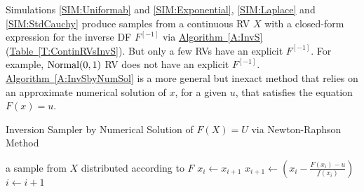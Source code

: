 Simulations \ref*{SIM:Uniformab} and \ref*{SIM:Exponential}, \ref*{SIM:Laplace} and \ref*{SIM:StdCauchy}
produce samples from a continuous RV $X$ with a closed-form expression for the inverse DF $F^{[-1]}$ via \hyperref[A:InvS]{Algorithm~\ref*{A:InvS}} (\hyperref[T:ContinRVsInvS]{Table~\ref*{T:ContinRVsInvS}}).  But only a few RVs have an explicit $F^{[-1]}$.  For example, $\mbox{{\rm Normal}}(0,1)$ RV does not have an explicit $F^{[-1]}$.
\hyperref[A:InvSbyNumSol]{Algorithm~\ref*{A:InvSbyNumSol}} is a more general but inexact method that relies on an approximate numerical solution of $x$, for a given $u$, that satisfies the equation $F(x)=u$.

\begin{algorithm}
\caption{Inversion Sampler by Numerical Solution of $F(X)=U$ via Newton-Raphson Method}
\label{A:InvSbyNumSol}
\begin{algorithmic}[1]
 a sample from $X$ distributed according to $F$
\STATE $x_i \gets x_{i+1}$
\STATE $x_{i+1} \gets \left( x_{i} - \frac{F(x_i)-u}{f(x_i)} \right)$
\STATE $i \gets i+1$
\ENDWHILE
{}
\end{algorithmic}
\end{algorithm}

